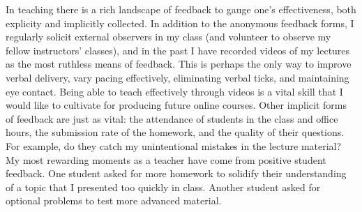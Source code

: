\documentclass{article}
\begin{document}

In teaching there is a rich landscape of feedback to gauge one's effectiveness,
both explicity and implicitly collected. In addition to the anonymous
feedback forms, I regularly solicit external observers in my class (and
volunteer to observe my fellow instructors' classes), and in the past I have
recorded videos of my lectures as the most ruthless means of feedback.
This is perhaps the only way to improve verbal delivery,
vary pacing effectively, eliminating verbal ticks, and maintaining eye contact.
Being
able to teach effectively through videos is a vital skill that I would like to
cultivate for producing future online courses.
Other implicit forms of
feedback are just as vital: the attendance of students in the class and
office hours, 
the submission rate of the homework, and the quality of their questions.
For example, do they catch my unintentional mistakes in the lecture material?
My most rewarding moments as a teacher have come from positive student feedback.
One student asked for more homework to solidify their understanding of a topic that I
presented too quickly in class. Another student asked for optional problems to
test more advanced material.

\end{document}
